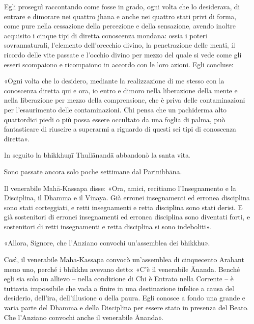  Egli proseguì raccontando come fosse in grado, ogni
volta che lo desiderava, di entrare e dimorare nei quattro jhāna e anche
nei quattro stati privi di forma, come pure nella cessazione della
percezione e della sensazione, avendo inoltre acquisito i cinque tipi di
diretta conoscenza mondana: ossia i poteri sovrannaturali, l’elemento
dell’orecchio divino, la penetrazione delle menti, il ricordo delle vite
passate e l’occhio divino per mezzo del quale si vede come gli esseri
scompaiono e ricompaiono in accordo con le loro azioni. Egli concluse:


 «Ogni volta che lo desidero, mediante la realizzazione di me
stesso con la conoscenza diretta qui e ora, io entro e dimoro nella
liberazione della mente e nella liberazione per mezzo della
comprensione, che è priva delle contaminazioni per l’esaurimento delle
contaminazioni. Chi pensa che un pachiderma alto quattordici piedi o più
possa essere occultato da una foglia di palma, può fantasticare di
riuscire a superarmi a riguardo di questi sei tipi di conoscenza
diretta».


In seguito la bhikkhuṇī Thullānandā abbandonò la santa vita.




 Sono passate ancora solo poche settimane dal
Parinibbāna.


 Il venerabile Mahā-Kassapa disse: «Ora, amici, recitiamo
l’Insegnamento e la Disciplina, il Dhamma e il Vinaya. Già erronei
insegnamenti ed erronea disciplina sono stati corteggiati, e retti
insegnamenti e retta disciplina sono stati derisi. E già sostenitori di
erronei insegnamenti ed erronea disciplina sono diventati forti, e
sostenitori di retti insegnamenti e retta disciplina si sono
indeboliti».


«Allora, Signore, che l’Anziano convochi un’assemblea dei bhikkhu».


Così, il venerabile Mahā-Kassapa convocò un’assemblea di cinquecento
Arahant meno uno, perché i bhikkhu avevano detto: «C’è il venerabile
Ānanda. Benché egli sia solo un allievo – nella condizione di Chi è
Entrato nella Corrente – è tuttavia impossibile che vada a finire in una
destinazione infelice a causa del desiderio, dell’ira, dell’illusione o
della paura. Egli conosce a fondo una grande e varia parte del Dhamma e
della Disciplina per essere stato in presenza del Beato. Che l’Anziano
convochi anche il venerabile Ānanda».


